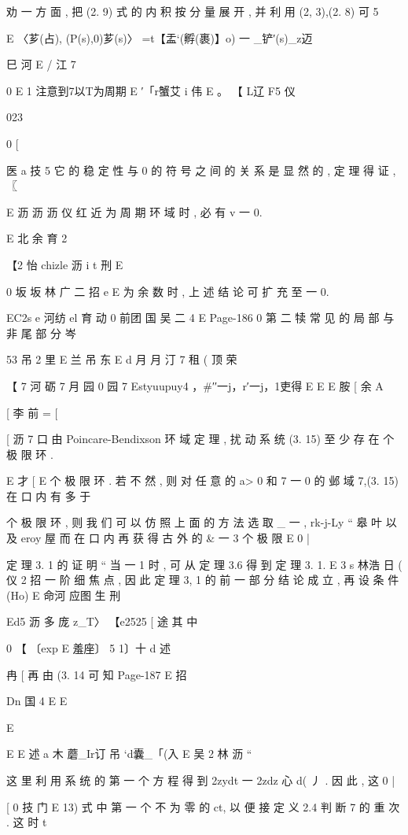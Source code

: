{{{{{{{{{{{{{{{{{{{劝 一 方 面 , 把 (2. 9) 式 的 内 积 按 分 量 展 开 , 并 利 用 (2, 3),(2. 8) 可
5

E 〈芗(占), (P(s),0)芗(s)〉
=t【盂`(孵(裹)】o) 一 _铲′(s)_z迈

巳 河 E /
江 7

0
E
1
注意到7以T为周期 E
′「r蟹艾 i 伟 E
。 【 L辽 F5 仪

023

0
[

医 a 技 5
它 的 稳 定 性 与 0 的 符 号 之 间 的 关 系 是 显 然 的 , 定 理 得 证 , 〖

E 沥 沥 沥 仪 红
近 为 周 期 环 域 时 , 必 有 v 一 0.

E 北 余 育 2

【2 怡 chizle 沥 i t 刑
E

0 坂 坂 林 广 二 招 e
E
为 余 数 时 , 上 述 结 论 可 扩 充 至 一 0.

EC2s e 河纺 el 育 动 0 前团 国 吴 二 4
E
Page-186
0 第 二 犊 常 见 的 局 部 与 非 尾 部 分 岑

53 吊 2 里
E 兰 吊 东
E d 月 月 汀 7 租 ( 顶 荣

【 7 河 砺 7 月 园 0 园 7
Estyuupuy4 ，#′′一j，r′一j，1吏得 E E
E 胺
[ 余 A

[ 李 前 = [

[ 沥 7 口
由 Poincare-Bendixson 环 域 定 理 , 扰 动 系 统 (3. 15) 至 少 存 在 个 极
限 环 .

E 才 [
E
个 极 限 环 . 若 不 然 , 则 对 任 意 的 a> 0 和 7 一 0 的 邺 域 7,(3. 15) 在
口 内 有 多 于 } 个 极 限 环 , 则 我 们 可 以 仿 照 上 面 的 方 法 选 取 _ 一 ,
rk-j-Ly “ 皋 叶 以 及 eroy 屋 而 在 口 内 再 获 得 古 外 的 & 一 3 个 极 限
E
0 |

定 理 3. 1 的 证 明 “ 当 一 1 时 , 可 从 定 理 3.6 得 到 定 理 3. 1.
E 3 s 林浩 日 ( 仪 2 招
一 阶 细 焦 点 , 因 此 定 理 3, 1 的 前 一 部 分 结 论 成 立 , 再 设 条 件 (Ho)
E 命河 应图 生 刑

Ed5 沥 多 庞 z_T〉 【e2525 [ 途
其 中

0 【 〔exp E 羞座〕 5 1〕十 d 述

冉
[
再 由 (3. 14 可 知
Page-187
E 招

Dn 国 4
E
E

E

E
E 述 a 木
蘑_Ir订 吊 `d囊_「(入 E 吴 2 林
沥 “

这 里 利 用 系 统 的 第 一 个 方 程 得 到 2zydt 一 2zdz 心 d( 丿 . 因 此 , 这
0 |

[
0 技 门
E
13) 式 中 第 一 个 不 为 零 的 ct, 以 便 接 定 义 2.4 判 断 7 的 重 次 . 这 时
t

}}}}}}}}}}}}}}}}}}
